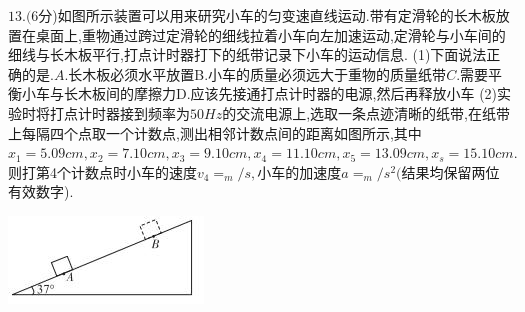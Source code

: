 \question[6] $13.(6$分)如图所示装置可以用来研究小车的匀变速直线运动.带有定滑轮的长木板放置在桌面上,重物通过跨过定滑轮的细线拉着小车向左加速运动,定滑轮与小车间的细线与长木板平行,打点计时器打下的纸带记录下小车的运动信息.
(1)下面说法正确的是$.A.$长木板必须水平放置B.小车的质量必须远大于重物的质量纸带$C.$需要平衡小车与长木板间的摩擦力D.应该先接通打点计时器的电源,然后再释放小车
(2)实验时将打点计时器接到频率为$50Hz$的交流电源上,选取一条点迹清晰的纸带,在纸带上每隔四个点取一个计数点,测出相邻计数点间的距离如图所示,其中$x_1=5.09cm,x_2=7.10cm,x_3=9.10cm,x_4=11.10cm,x_5=13.09cm,x_s=15.10cm.$则打第4个计数点时小车的速度$v_4=_m/s,$小车的加速度$a=_m/s^2($结果均保留两位有效数字).
\begin{center}
\includegraphics[]{img/image13.jpeg}
\end{center}

